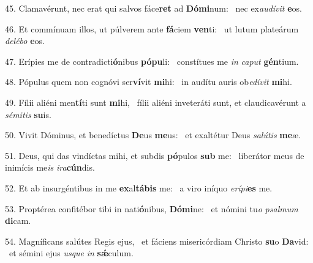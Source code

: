 45. Clamavérunt, nec erat qui salvos fáce\textbf{ret} ad \textbf{Dó}\textbf{mi}num: \ast\  nec ex\textit{au}\textit{dí}\textit{vit} \textbf{e}os.\

46. Et commínuam illos, ut púlverem ante \textbf{fá}ciem \textbf{ven}ti: \ast\  ut lutum plateárum \textit{de}\textit{lé}\textit{bo} \textbf{e}os.\

47. Erípies me de contradicti\textbf{ó}nibus \textbf{pó}\textbf{pu}li: \ast\  constítues me \textit{in} \textit{ca}\textit{put} \textbf{gén}tium.\

48. Pópulus quem non cognóvi ser\textbf{ví}vit \textbf{mi}hi: \ast\  in audítu auris ob\textit{e}\textit{dí}\textit{vit} \textbf{mi}hi.\

49. Fílii aliéni men\textbf{tí}ti sunt \textbf{mi}hi, \ast\  fílii aliéni inveteráti sunt, et claudicavérunt a \textit{sé}\textit{mi}\textit{tis} \textbf{su}is.\

50. Vivit Dóminus, et benedíctus \textbf{De}us \textbf{me}us: \ast\  et exaltétur Deus \textit{sa}\textit{lú}\textit{tis} \textbf{me}æ.\

51. Deus, qui das vindíctas mihi, et subdis \textbf{pó}pulos \textbf{sub} me: \ast\  liberátor meus de inimícis me\textit{is} \textit{i}\textit{ra}\textbf{cún}dis.\

52. Et ab insurgéntibus in me \textbf{ex}al\textbf{tá}\textbf{bis} me: \ast\  a viro iníquo \textit{e}\textit{rí}\textit{pi}\textbf{es} me.\

53. Proptérea confitébor tibi in nati\textbf{ó}nibus, \textbf{Dó}\textbf{mi}ne: \ast\  et nómini tu\textit{o} \textit{psal}\textit{mum} \textbf{di}cam.\

54. Magníficans salútes Regis ejus, \dag\  et fáciens misericórdiam Christo \textbf{su}o \textbf{Da}vid: \ast\  et sémini ejus \textit{us}\textit{que} \textit{in} \textbf{sǽ}culum.\

